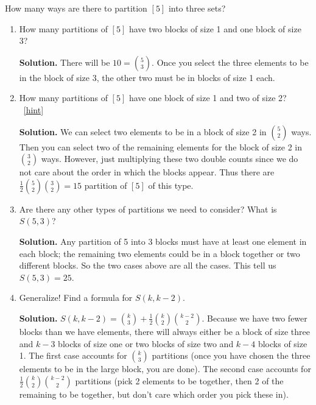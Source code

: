 \documentclass{book}
\begin{document}
\setcounter{project}{274}
\addtocounter{project}{-1}
\begin{activity}[]\label{activity-267}
\hypertarget{p-1468}{}%
How many ways are there to partition \([5]\) into three sets?%
\begin{enumerate}[font=\bfseries,label=(\alph*),ref=\alph*]
\item\label{task-257} \hypertarget{p-1469}{}%
How many partitions of \([5]\) have two blocks of size 1 and one block of size 3?%
\par\smallskip%
\noindent\textbf{Solution.}\hypertarget{solution-215}{}\quad%
\hypertarget{p-1470}{}%
There will be \(10 = \binom{5}{3}\).  Once you select the three elements to be in the block of size 3, the other two must be in blocks of size 1 each.%
\item\label{task-258} \hypertarget{p-1471}{}%
How many partitions of \([5]\) have one block of size 1 and two of size 2?%
~\hfill{\tiny\hyperlink{a-274.b}{[hint]}\hypertarget{q-274.b}{}}\par\smallskip%
\noindent\textbf{Solution.}\hypertarget{solution-216}{}\quad%
\hypertarget{p-1473}{}%
We can select two elements to be in a block of size 2 in \(\binom{5}{2}\) ways.  Then you can select two of the remaining elements for the block of size 2 in \(\binom{3}{2}\) ways.  However, just multiplying these two double counts since we do not care about the order in which the blocks appear.  Thus there are \(\frac{1}{2}\binom{5}{2}\binom{3}{2} = 15\) partition of \([5]\) of this type.%
\item\label{task-259} \hypertarget{p-1474}{}%
Are there any other types of partitions we need to consider?  What is \(S(5,3)\)?%
\par\smallskip%
\noindent\textbf{Solution.}\hypertarget{solution-217}{}\quad%
\hypertarget{p-1475}{}%
Any partition of 5 into 3 blocks must have at least one element in each block; the remaining two elements could be in a block together or two different blocks.  So the two cases above are all the cases.  This tell us \(S(5,3) = 25\).%
\item\label{task-260} \hypertarget{p-1476}{}%
Generalize! Find a formula for \(S(k, k-2)\).%
\par\smallskip%
\noindent\textbf{Solution.}\hypertarget{solution-218}{}\quad%
\hypertarget{p-1477}{}%
\(S(k, k-2) = \binom{k}{3} + \frac{1}{2}\binom{k}{2}\binom{k-2}{2}\).  Because we have two fewer blocks than we have elements, there will always either be a block of size three and \(k-3\) blocks of size one or two blocks of size two and \(k-4\) blocks of size 1.  The first case accounts for \(\binom{k}{3}\) partitions (once you have chosen the three elements to be in the large block, you are done).  The second case accounts for \(\frac{1}{2}\binom{k}{2}\binom{k-2}{2}\) partitions (pick 2 elements to be together, then 2 of the remaining to be together, but don't care which order you pick these in).%

\end{enumerate}
\end{activity}
\end{document}
